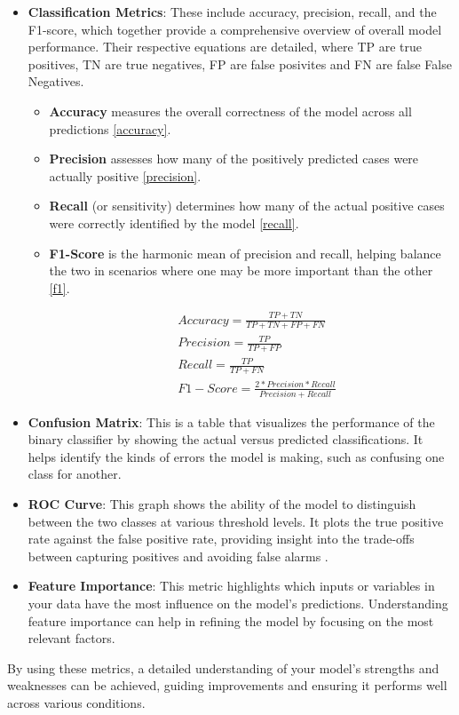 \begin{itemize}
    \item \textbf{Classification Metrics}: These include accuracy, precision, recall, and the F1-score, which together provide a comprehensive overview of overall model performance. Their respective equations are detailed, where TP are true positives, TN are true negatives, FP are false posivites and FN are false False Negatives.
    \begin{itemize}
        \item \textbf{Accuracy} measures the overall correctness of the model across all predictions \ref{accuracy}. 
        \item \textbf{Precision} assesses how many of the positively predicted cases were actually positive \ref{precision}.
        \item \textbf{Recall} (or sensitivity) determines how many of the actual positive cases were correctly identified by the model \ref{recall}.
        \item \textbf{F1-Score} is the harmonic mean of precision and recall, helping balance the two in scenarios where one may be more important than the other \ref{f1}.
        
        \begin{align} 
            &\mathit{Accuracy} = \frac{TP+TN}{TP+TN+FP+FN} \label{accuracy}\\
            &\mathit{Precision} = \frac{TP}{TP+FP} \label{precision}\\
            &\mathit{Recall} = \frac{TP}{TP+FN} \label{recall}\\
            &F1-Score = \frac{2*\mathit{Precision}*\mathit{Recall}}{\mathit{Precision}+\mathit{Recall} \label{f1}}
        \end{align}
    \end{itemize}
    \item \textbf{Confusion Matrix}: This is a table that visualizes the performance of the binary classifier by showing the actual versus predicted classifications. It helps identify the kinds of errors the model is making, such as confusing one class for another.
    \item \textbf{ROC Curve}: This graph shows the ability of the model to distinguish between the two classes at various threshold levels. It plots the true positive rate against the false positive rate, providing insight into the trade-offs between capturing positives and avoiding false alarms \cite{hoo2017roc}.
    \item \textbf{Feature Importance}: This metric highlights which inputs or variables in your data have the most influence on the model’s predictions. Understanding feature importance can help in refining the model by focusing on the most relevant factors.
\end{itemize}

By using these metrics, a detailed understanding of your model's strengths and weaknesses can be achieved, guiding improvements and ensuring it performs well across various conditions.